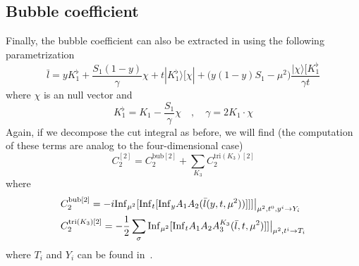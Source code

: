 \subsection{Bubble coefficient}
Finally, the bubble coefficient can also be extracted in using the following parametrization
\begin{equation*}
\bar{l} = y K_1^\flat + \frac{S_1(1-y)}{\gamma}\chi + t|K_1^\flat\rangle[\chi| 
+\big(y(1-y)S_1 - \mu^2\big)\frac{|\chi\rangle[K_1^\flat}{\gamma t}
\end{equation*}
where $\chi$ is an null vector and 
\begin{equation*}
K_1^\flat = K_1 - \frac{S_1}{\gamma}\chi
\quad,\quad
\gamma = 2K_1\cdot\chi
\end{equation*}
Again, if we decompose the cut integral as before, we will find (the computation of these terms are analog to the four-dimensional case)
\begin{equation*}
C_2^{[2]} = C_2^{\mathrm{bub}[2]} + \sum_{K_3}C_2^{\mathrm{tri}(K_3)[2]}
\end{equation*}
where
\begin{equation*}
\begin{split}
& C_2^{\mathrm{bub}[2]} = -i\mathrm{Inf}_{\mu^2}[\mathrm{Inf}_t[\mathrm{Inf}_y A_1 A_2(\bar{l}(y,t,\mu^2))]]]\big|_{\mu^2,t^0,y^i\rightarrow Y_i}
\\
& C_2^{\mathrm{tri}(K_3)[2]} = -\frac{1}{2}\sum_{\sigma}\mathrm{Inf}_{\mu^2}[\mathrm{Inf}_tA_1A_2A_3^{K_3}(\bar{l}, t, \mu^2)]]\big|_{\mu^2,t^i\rightarrow T_i}
\end{split}
\end{equation*}
where $T_i$ and $Y_i$ can be found in~\cite{Kilgore:2007qr}.





















